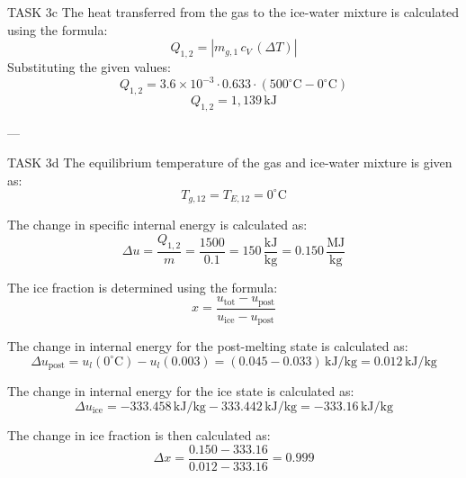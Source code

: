 TASK 3c  
The heat transferred from the gas to the ice-water mixture is calculated using the formula:  
\[
Q_{1,2} = |m_{g,1} \, c_V \, (\Delta T)|
\]  
Substituting the given values:  
\[
Q_{1,2} = 3.6 \times 10^{-3} \cdot 0.633 \cdot (500^\circ\text{C} - 0^\circ\text{C})
\]  
\[
Q_{1,2} = 1,139 \, \text{kJ}
\]  

---

TASK 3d  
The equilibrium temperature of the gas and ice-water mixture is given as:  
\[
T_{g,12} = T_{E,12} = 0^\circ\text{C}
\]  

The change in specific internal energy is calculated as:  
\[
\Delta u = \frac{Q_{1,2}}{m} = \frac{1500}{0.1} = 150 \, \frac{\text{kJ}}{\text{kg}} = 0.150 \, \frac{\text{MJ}}{\text{kg}}
\]  

The ice fraction is determined using the formula:  
\[
x = \frac{u_{\text{tot}} - u_{\text{post}}}{u_{\text{ice}} - u_{\text{post}}}
\]  

The change in internal energy for the post-melting state is calculated as:  
\[
\Delta u_{\text{post}} = u_l(0^\circ\text{C}) - u_l(0.003) = (0.045 - 0.033) \, \text{kJ/kg} = 0.012 \, \text{kJ/kg}
\]  

The change in internal energy for the ice state is calculated as:  
\[
\Delta u_{\text{ice}} = -333.458 \, \text{kJ/kg} - 333.442 \, \text{kJ/kg} = -333.16 \, \text{kJ/kg}
\]  

The change in ice fraction is then calculated as:  
\[
\Delta x = \frac{0.150 - 333.16}{0.012 - 333.16} = 0.999
\]  